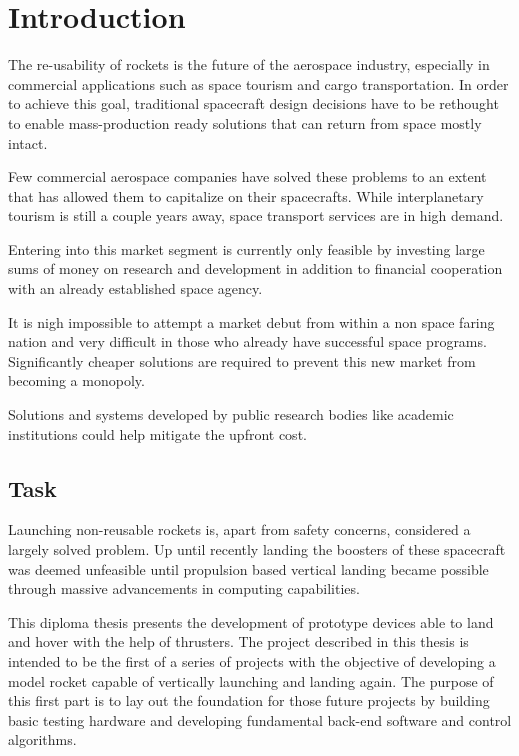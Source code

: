 \chapter{Introduction}
\author{Sebastian Schaffler}

The re-usability of rockets is the future of the aerospace industry, especially in commercial applications such as space tourism and cargo transportation. In order to achieve this goal, traditional spacecraft design decisions have to be rethought to enable mass-production ready solutions that can return from space mostly intact. 

Few commercial aerospace companies have solved these problems to an extent that has allowed them to capitalize on their spacecrafts. While interplanetary tourism is still a couple years away, space transport services are in high demand.

Entering into this market segment is currently only feasible by investing large sums of money on research and development in addition to financial cooperation with an already established space agency.

It is nigh impossible to attempt a market debut from within a non space faring nation and very difficult in those who already have successful space programs. Significantly cheaper solutions are required to prevent this new market from becoming a monopoly.

Solutions and systems developed by public research bodies like academic institutions could help mitigate the upfront cost.

\section{Task}

Launching non-reusable rockets is, apart from safety concerns, considered a largely solved problem. Up until recently landing the boosters of these spacecraft was deemed unfeasible until propulsion based vertical landing became possible through massive advancements in computing capabilities. 

This diploma thesis presents the development of prototype devices able to land and hover with the help of thrusters. The project described in this thesis is intended to be the first of a series of projects with the objective of developing a model rocket capable of vertically launching and landing again. The purpose of this first part is to lay out the foundation for those future projects by building basic testing hardware and developing fundamental back-end software and control algorithms.




